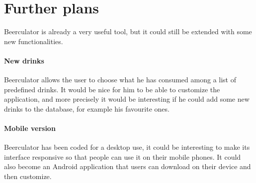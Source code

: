 \section{Further plans}
\label{sec:ideas}

Beerculator is already a very useful tool, but it could still be extended with some new functionalities. 

\paragraph{New drinks} Beerculator allows the user to choose what he has consumed among a list of predefined drinks. It would be nice for him to be able to customize the application, and more precisely it would be interesting if he could add some new drinks to the database, for example his favourite ones.
\paragraph{Mobile version} Beerculator has been coded for a desktop use, it could be interesting to make its interface responsive so that people can use it on their mobile phones. It could also become an Android application that users can download on their device and then customize.
